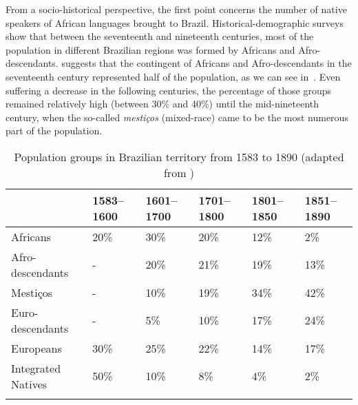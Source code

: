 \documentclass[output=paper]{langsci/langscibook}
\begin{document}
From a socio-historical perspective, the first point concerns the number of
native speakers of African languages brought to Brazil. Historical-demographic
surveys show that between the seventeenth and nineteenth centuries, most of the
population in different Brazilian regions was formed by Africans and
Afro-descendants. \citet[163]{Mussa1991} suggests that the contingent of
Africans and Afro-descendants in the seventeenth century represented half of
the population, as we can see in~. Even suffering a decrease
in the following centuries, the percentage of those groups remained relatively
high (between 30\% and 40\%) until the mid-nineteenth century, when the
so-called \emph{mestiços} (mixed-race) came to be the most numerous part of the
population.\largerpage[1]

\begin{table}[htpb]
    \centering
    {\small
    \begin{tabular}{llllll}
    \lsptoprule
    & \textbf{1583--1600} & \textbf{1601--1700} & \textbf{1701--1800} & \textbf{1801--1850} & \textbf{1851--1890}\\
    \midrule
    Africans & 20\% & 30\% & 20\% & 12\% & 2\%\\
    Afro-descendants & {}- & 20\% & 21\% & 19\% & 13\%\\
    Mestiços & {}- & 10\% & 19\% & 34\% & 42\%\\
    Euro-descendants & {}- & 5\% & 10\% & 17\% & 24\%\\
    Europeans & 30\% & 25\% & 22\% & 14\% & 17\%\\
    Integrated Natives & 50\% & 10\% & 8\% & 4\% & 2\%\\
    \lspbottomrule
    \end{tabular}
    }
    \caption{Population groups in Brazilian territory from 1583 to 1890
    (adapted from \citealt[163]{Mussa1991})}\label{tab:key:14.1}
\end{table}
\end{document}
